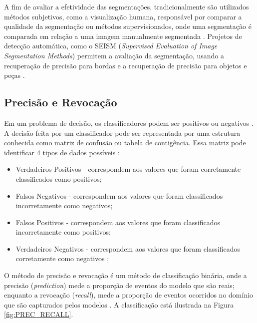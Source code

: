 \begin{document}
A fim de avaliar a efetividade das segmentações, tradicionalmente são utilizados métodos subjetivos, como a visualização humana, responsável por comparar a qualidade da segmentação ou métodos supervisionados, onde uma segmentação é comparada em relação a uma imagem manualmente segmentada \cite{ZHANG2008}. Projetos de detecção automática, como o SEISM (\textit{Supervised Evaluation of Image Segmentation Methods}) permitem a avaliação da segmentação, usando a recuperação de precisão para bordas e a recuperação de precisão para objetos e peças \cite{SEISM}.


\subsection{Precisão e Revocação} \label{ssec:prec_recall}

Em um problema de decisão, os classificadores podem ser positivos ou negativos \cite{PRECISION_RECALL}. A decisão feita por um classificador pode ser representada por uma estrutura conhecida como matriz de confusão ou tabela de contigência. Essa matriz pode identificar 4 tipos de dados possíveis \cite{PRECISION_RECALL}:

\begin{itemize}
 \item Verdadeiros Positivos - correspondem aos valores que foram corretamente classificados como positivos;
 \item Falsos Negativos - correspondem aos valores que foram classificados incorretamente como negativos;
 \item Falsos Positivos - correspondem aos valores que foram classificados incorretamente como positivos;
 \item Verdadeiros Negativos - correspondem aos valores que foram classificados corretamente como negativos \cite{PRECISION_RECALL};
\end{itemize}

O método de precisão e revocação é um método de classificação binária, onde a precisão (\textit{prediction}) mede a proporção de eventos do modelo que são reais; enquanto a revocação (\textit{recall}), mede a proporção de eventos ocorridos no domínio que são capturados pelos modelos \cite{PREC_RECALL_REGR}. A classificação está ilustrada na Figura \ref{fig:PREC_RECALL}. 
\end{document}
